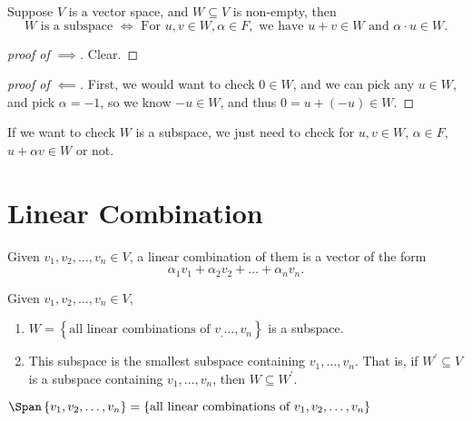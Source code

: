 \begin{proposition}
    Suppose \(V\) is a vector space, and \(W \subseteq V\) is non-empty, then 
    \[
        W \text{ is a subspace } \iff \text{ For }u,v \in W, \alpha \in F, \text{ we have } u + v \in W \text{ and } \alpha \cdot u \in W.
    \]  
\end{proposition}
\begin{proof}[proof of \(\implies \)]
    Clear.
\end{proof}
\begin{proof}[proof of \(\impliedby \)]
    First, we would want to check \(0 \in W\), and we can pick any \(u \in W\), and pick \(\alpha = -1\), so we know \(-u \in W\), and thus \(0 = u + (-u) \in W\).     
\end{proof}

\begin{corollary}
    If we want to check \(W\) is a subspace, we just need to check for \(u,v \in W\), \(\alpha \in F\), \(u + \alpha v \in W\) or not.    
\end{corollary}

\section{Linear Combination}
\begin{definition} \label{dfn: linear combination}
    Given \(v_1, v_2, \dots , v_n \in V\), a linear combination of them is a vector of the form
    \[
        \alpha _1 v_1 + \alpha _2 v_2 + \dots + \alpha _n v_n.
    \] 
\end{definition}

\begin{proposition}
    Given \(v_1, v_2, \dots , v_n \in V\), 
    \begin{enumerate}
        \item \(W = \left\{ \text{all linear combinations of } v_, \dots , v_n \right\} \) is a subspace.
        \item  This subspace is the smallest subspace containing \(v_1, \dots , v_n\). That is, if \(W^{\prime} \subseteq V\) is a subspace containing \(v_1, \dots , v_n\), then \(W \subseteq W^{\prime} \).    
    \end{enumerate} 
    \begin{notation}
        \(\Span \left\{v_1, v_2, \dots , v_n \right\} = \left\{ \text{all linear combinations of } v_1, v_2, \dots , v_n \right\} \)
    \end{notation}
\end{proposition}

